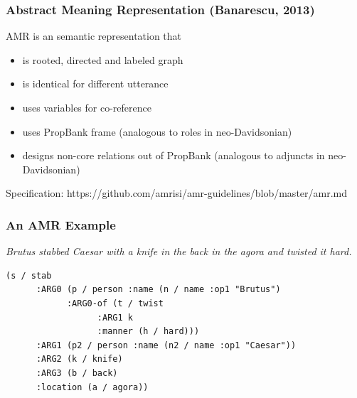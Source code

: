 \documentclass{beamer}
\begin{document}
\begin{frame}
    \frametitle{Abstract Meaning Representation (Banarescu, 2013)}

    AMR is an semantic representation that

    \begin{itemize}
        \item is rooted, directed and labeled graph
        \item is identical for different utterance
        \item uses variables for co-reference
        \item uses PropBank frame (analogous to roles in neo-Davidsonian)
        \item designs non-core relations out of PropBank
            (analogous to adjuncts in neo-Davidsonian)
    \end{itemize}

    Specification: https://github.com/amrisi/amr-guidelines/blob/master/amr.md

\end{frame}

\begin{frame}[fragile] %
    \frametitle{An AMR Example}

    \emph{Brutus stabbed Caesar with a knife in the back in the agora and twisted it hard.}

    \begin{verbatim}
(s / stab
      :ARG0 (p / person :name (n / name :op1 "Brutus")
            :ARG0-of (t / twist
                  :ARG1 k
                  :manner (h / hard)))
      :ARG1 (p2 / person :name (n2 / name :op1 "Caesar"))
      :ARG2 (k / knife)
      :ARG3 (b / back)
      :location (a / agora))
    \end{verbatim}
\end{frame}
\end{document}
